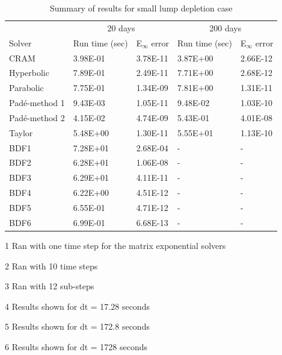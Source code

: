 \clearpage

\begin{table}[p]
\centering
\begin{threeparttable}
   \caption{\label{tab:small_lumped_depletion_runtimes} Summary of results for small lump depletion case}
   \begin{tabular}{lllll}
   \hline
   \multicolumn{1}{c}{} & \multicolumn{2}{c}{20 days\tnote{1}} & \multicolumn{2}{c}{200 days\tnote{2}} \\
   \cline{2-5} 
   Solver & Run time (sec) & E$_{\infty}$ error & Run time (sec) & E$_{\infty}$ error \\
   \hline
   CRAM\tnote{3} & 3.98E-01 & 3.78E-11 & 3.87E+00 & 2.66E-12 \\
   Hyperbolic\tnote{3} & 7.89E-01 & 2.49E-11 & 7.71E+00 & 2.68E-12 \\
   Parabolic\tnote{3} & 7.75E-01 & 1.34E-09 & 7.81E+00 & 1.31E-11 \\
   Pad\'e-method 1 & 9.43E-03 & 1.05E-11 & 9.48E-02 & 1.03E-10 \\
   Pad\'e-method 2 & 4.15E-02 & 4.74E-09 & 5.43E-01 & 4.01E-08 \\
   Taylor & 5.48E+00 & 1.30E-11 & 5.55E+01 & 1.13E-10 \\
   BDF1\tnote{4} & 7.28E+01 & 2.68E-04 & - & - \\
   BDF2\tnote{4} & 6.28E+01 & 1.06E-08 & - & - \\
   BDF3\tnote{4} & 6.29E+01 & 4.11E-11 & - & - \\
   BDF4\tnote{5} & 6.22E+00 & 4.51E-12 & - & - \\
   BDF5\tnote{6} & 6.55E-01 & 4.71E-12 & - & - \\
   BDF6\tnote{6} & 6.99E-01 & 6.68E-13 & - & - \\
   \hline
   \end{tabular}
	\begin{tablenotes}
      \small
      \item [1] Ran with one time step for the matrix exponential solvers
      \item [2] Ran with 10 time steps
      \item [3] Ran with 12 sub-steps
      \item [4] Results shown for dt = 17.28 seconds
      \item [5] Results shown for dt = 172.8 seconds
      \item [6] Results shown for dt = 1728 seconds
    \end{tablenotes}
\end{threeparttable}
\end{table} 

